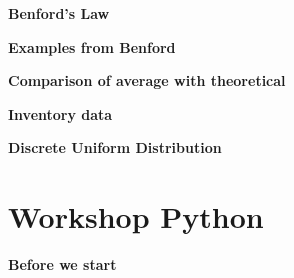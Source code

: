 \begin{exercise}
\label{ex:benfords_law_workshop}

\textbf{Benford's Law}



\end{exercise}

\begin{exercise}
\label{ex:benford_examples}

\textbf{Examples from Benford}



\end{exercise}

\begin{exercise}
\label{ex:benford_average_comparison}

\textbf{Comparison of average with theoretical}



\end{exercise}

\begin{exercise}
\label{ex:inventory_goodness_of_fit}

\textbf{Inventory data}








\end{exercise}

\begin{exercise}
\label{ex:discrete_uniform_distribution}

\textbf{Discrete Uniform Distribution}




\end{exercise}

\section{Workshop Python}

\begin{exercise}
\label{ex:gof_before_start_p}

\textbf{Before we start}



\end{exercise}

